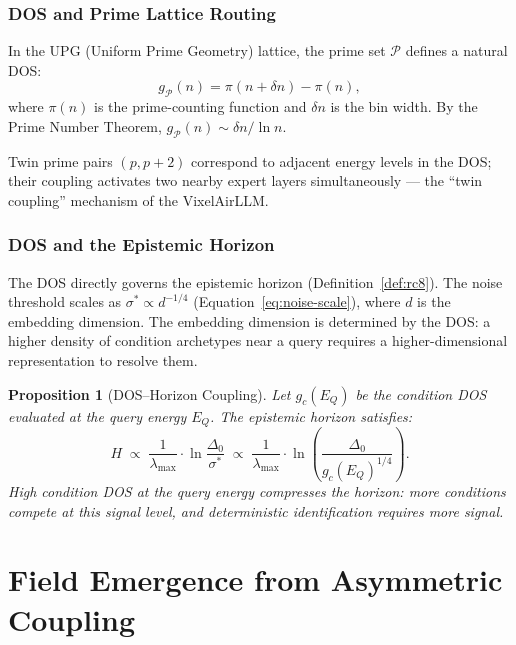 \documentclass[11pt,twoside]{article}
\theoremstyle{plain}
\newtheorem{proposition}[theorem]{Proposition}
\theoremstyle{definition}
\theoremstyle{remark}
\begin{document}
\section{DOS and Prime Lattice Routing}

In the UPG (Uniform Prime Geometry) lattice, the prime set $\mathcal{P}$
defines a natural DOS:
\begin{equation}\label{eq:prime-dos}
  g_\mathcal{P}(n) = \pi(n+\delta n) - \pi(n),
\end{equation}
where $\pi(n)$ is the prime-counting function and $\delta n$ is the bin width.
By the Prime Number Theorem, $g_\mathcal{P}(n)\sim\delta n/\ln n$.

Twin prime pairs $(p, p+2)$ correspond to adjacent energy levels in the DOS;
their coupling activates two nearby expert layers simultaneously --- the
``twin coupling'' mechanism of the VixelAirLLM.

\section{DOS and the Epistemic Horizon}

The DOS directly governs the epistemic horizon (Definition~\ref{def:rc8}).
The noise threshold scales as $\sigma^*\propto d^{-1/4}$ (Equation~\eqref{eq:noise-scale}),
where $d$ is the embedding dimension.  The embedding dimension is determined
by the DOS: a higher density of condition archetypes near a query requires
a higher-dimensional representation to resolve them.

\begin{proposition}[DOS--Horizon Coupling]
Let $g_c(E_Q)$ be the condition DOS evaluated at the query energy $E_Q$.
The epistemic horizon satisfies:
\begin{equation}
  H \;\propto\; \frac{1}{\lambda_{\max}}\cdot\ln\frac{\Delta_0}{\sigma^*}
     \;\propto\; \frac{1}{\lambda_{\max}}\cdot
     \ln\!\left(\frac{\Delta_0}{g_c(E_Q)^{1/4}}\right).
\end{equation}
High condition DOS at the query energy compresses the horizon: more conditions
compete at this signal level, and deterministic identification requires more
signal.
\end{proposition}

\part{Field Emergence from Asymmetric Coupling}
\end{document}
